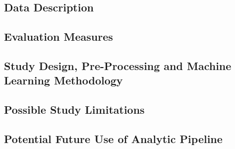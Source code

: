 \documentclass[twoside,11pt]{article}
\begin{document}
\subsection{Data Description}


\subsection{Evaluation Measures}

\subsection{Study Design, Pre-Processing and Machine Learning Methodology}


\subsection{Possible Study Limitations}

\subsection{Potential Future Use of Analytic Pipeline}


\end{document}

